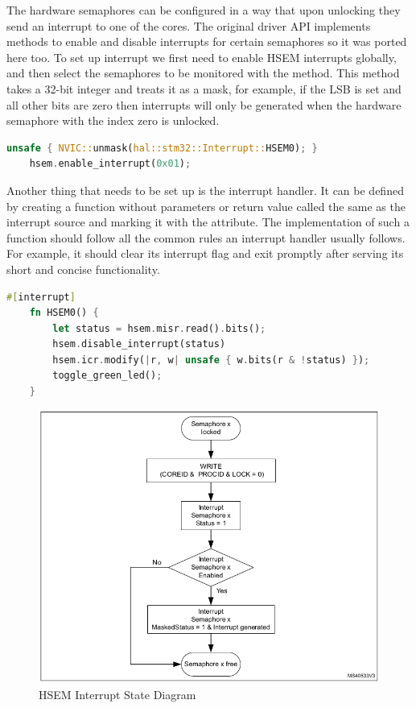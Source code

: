 The hardware semaphores can be configured in a way that upon unlocking they send an interrupt to one of the cores. The original driver API implements methods to enable and disable interrupts for certain semaphores so it was ported here too. To set up interrupt we first need to enable HSEM interrupts globally, and then select the semaphores to be monitored with the  method. This method takes a 32-bit integer and treats it as a mask, for example, if the LSB is set and all other bits are zero then interrupts will only be generated when the hardware semaphore with the index zero is unlocked.

\begin{lstlisting}[language=Rust,frame=single,float=!ht,style=customrust,label={lst:interrupt-hsem-conf},caption={Enabling a HSEM Interrupt}]
    unsafe { NVIC::unmask(hal::stm32::Interrupt::HSEM0); }
    hsem.enable_interrupt(0x01);
\end{lstlisting}

Another thing that needs to be set up is the interrupt handler. It can be defined by creating a function without parameters or return value called the same as the interrupt source and marking it with the \mycode{#[interrupt]} attribute. The implementation of such a function should follow all the common rules an interrupt handler usually follows. For example, it should clear its interrupt flag and exit promptly after serving its short and concise functionality.

\begin{lstlisting}[language=Rust,frame=single,float=!ht,style=customrust,label={lst:interrupt-hsem-ex},caption={An Example HSEM Interrupt Handler}]
    #[interrupt]
    fn HSEM0() {
        let status = hsem.misr.read().bits();
        hsem.disable_interrupt(status)
        hsem.icr.modify(|r, w| unsafe { w.bits(r & !status) });
        toggle_green_led();
    }
\end{lstlisting}

\begin{figure}[!ht]
    \centering
    \includegraphics[width=150mm, keepaspectratio]{figures/hsem-interrupt.png}
    \caption{HSEM Interrupt State Diagram\cite{HsemInterrupt}}
    \label{fig:hsem-interrupt-sd}
\end{figure}

